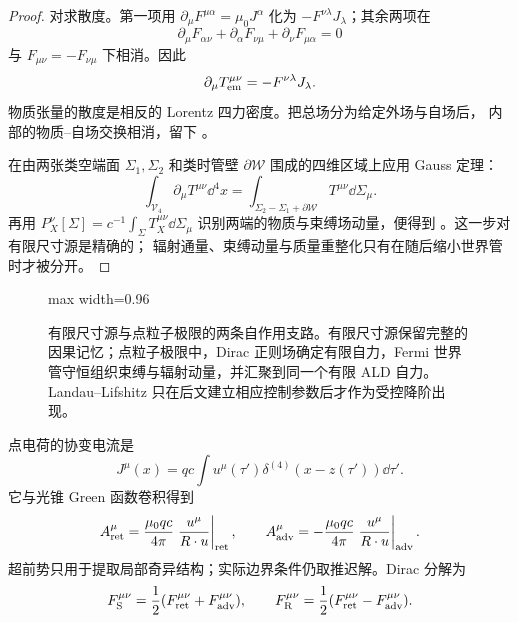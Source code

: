 \begin{proof}
对求散度。第一项用
\(\partial_\mu F^{\mu\alpha}=\mu_0J^\alpha\) 化为
\(-F^{\nu\lambda}J_\lambda\)；其余两项在
\[
 \partial_\mu F_{\alpha\nu}+\partial_\alpha F_{\nu\mu}
 +\partial_\nu F_{\mu\alpha}=0
\]
与 \(F_{\mu\nu}=-F_{\nu\mu}\) 下相消。因此
\[
 \partial_\mu T_{\rm em}^{\mu\nu}=-F^{\nu\lambda}J_\lambda .
\]
物质张量的散度是相反的 Lorentz 四力密度。把总场分为给定外场与自场后，
内部的物质--自场交换相消，留下
。

在由两张类空端面 \(\Sigma_1,\Sigma_2\) 和类时管壁
\(\partial\mathcal W\) 围成的四维区域上应用 Gauss 定理：
\[
 \int_{\mathcal V_4}\partial_\mu T^{\mu\nu}\dd^4x
 =\int_{\Sigma_2-\Sigma_1+\partial\mathcal W}
 T^{\mu\nu}\dd\Sigma_\mu .
\]
再用
\(P_X^\nu[\Sigma]=c^{-1}\int_\Sigma T_X^{\mu\nu}\dd\Sigma_\mu\)
识别两端的物质与束缚场动量，便得到
。这一步对有限尺寸源是精确的；
辐射通量、束缚动量与质量重整化只有在随后缩小世界管时才被分开。
\end{proof}

\begin{figure}[htbp]
\centering
\begin{adjustbox}{max width=0.96\linewidth}

\end{adjustbox}
\caption{有限尺寸源与点粒子极限的两条自作用支路。有限尺寸源保留完整的因果记忆；点粒子极限中，Dirac 正则场确定有限自力，Fermi 世界管守恒组织束缚与辐射动量，并汇聚到同一个有限 ALD 自力。Landau--Lifshitz 只在后文建立相应控制参数后才作为受控降阶出现。}
\label{fig:phys-rr-dirac-self-force-decomposition}
\end{figure}

\begin{definition}
点电荷的协变电流是
\begin{equation}
 J^\mu(x)=qc\int u^\mu(\tau')\delta^{(4)}
 (x-z(\tau'))\dd\tau' .
 \label{eq:phys-rr-point-current}
\end{equation}
它与光锥 Green 函数卷积得到
\begin{equation}
 A_{\rm ret}^\mu
 =\frac{\mu_0qc}{4\pi}
 \left.\frac{u^\mu}{R\cdot u}\right|_{\rm ret},
 \qquad
 A_{\rm adv}^\mu
 =-\frac{\mu_0qc}{4\pi}
 \left.\frac{u^\mu}{R\cdot u}\right|_{\rm adv}.
 \label{eq:phys-rr-lw-four-potential}
\end{equation}
超前势只用于提取局部奇异结构；实际边界条件仍取推迟解。Dirac 分解为
\begin{equation}
 F_{\rm S}^{\mu\nu}=\frac12(F_{\rm ret}^{\mu\nu}+F_{\rm adv}^{\mu\nu}),
 \qquad
 F_{\rm R}^{\mu\nu}=\frac12(F_{\rm ret}^{\mu\nu}-F_{\rm adv}^{\mu\nu}).
 \label{eq:phys-rr-dirac-split}
\end{equation}
\end{definition}


